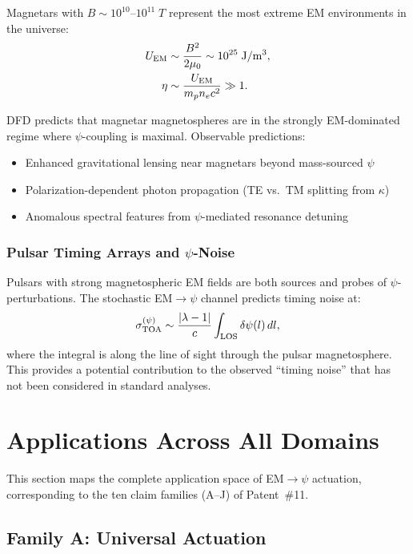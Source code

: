 \documentclass[aps,prd,twocolumn,superscriptaddress,floatfix,nofootinbib]{revtex4-2}
\newcommand{\lam}{\lambda}
\begin{document}
Magnetars with $B \sim 10^{10}$--$10^{11}\;\si{T}$ represent the most
extreme EM environments in the universe:
\begin{align}
U_{\rm EM} &\sim \frac{B^2}{2\mu_0} \sim 10^{25}\;\si{J/m^3},\\
\eta &\sim \frac{U_{\rm EM}}{m_p n_e c^2} \gg 1.
\end{align}

DFD predicts that magnetar magnetospheres are in the strongly
EM-dominated regime where $\psi$-coupling is maximal. Observable
predictions:
\begin{itemize}[nosep]
\item Enhanced gravitational lensing near magnetars beyond
mass-sourced $\psi$
\item Polarization-dependent photon propagation (TE vs.\ TM splitting
from $\kappa$)
\item Anomalous spectral features from $\psi$-mediated resonance
detuning
\end{itemize}

\subsubsection{Pulsar Timing Arrays and $\psi$-Noise}

Pulsars with strong magnetospheric EM fields are both sources and
probes of $\psi$-perturbations. The stochastic EM$\to\psi$ channel
predicts timing noise at:
\begin{equation}
\sigma_{\rm TOA}^{(\psi)} \sim \frac{|\lam-1|}{c}\int_{\rm LOS}
\delta\psi(l)\,dl,
\end{equation}
where the integral is along the line of sight through the pulsar
magnetosphere. This provides a potential contribution to the observed
``timing noise'' that has not been considered in standard analyses.

\section{Applications Across All Domains}\label{sec:applications}

This section maps the complete application space of EM$\to\psi$
actuation, corresponding to the ten claim families (A--J) of
Patent~\#11.

\subsection{Family A: Universal Actuation}
\end{document}
